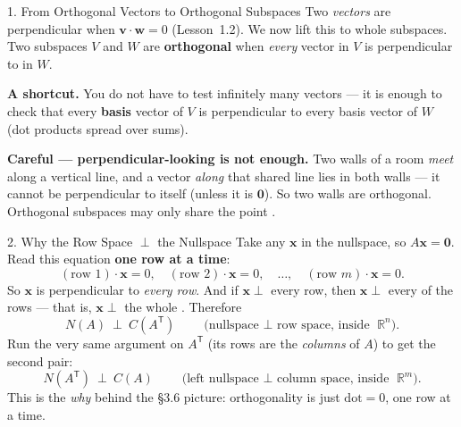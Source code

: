 \documentclass[10pt]{article}
\newcommand{\vv}{\mathbf{v}}
\newcommand{\ww}{\mathbf{w}}
\newcommand{\xx}{\mathbf{x}}
\newcommand{\zero}{\mathbf{0}}
\newcommand{\T}{\mathsf{T}}
\begin{document}
\begin{notesbox}{1. From Orthogonal Vectors to Orthogonal Subspaces}
Two \emph{vectors} are perpendicular when $\vv\cdot\ww=0$ (Lesson~1.2). We now lift this to whole
subspaces. Two subspaces $V$ and $W$ are \textbf{orthogonal} when \emph{every} vector in $V$ is
perpendicular to  in $W$.

\vspace{3pt}
\textbf{A shortcut.} You do not have to test infinitely many vectors --- it is enough to check that
every \textbf{basis} vector of $V$ is perpendicular to every basis vector of $W$ (dot products spread
over sums).

\vspace{3pt}
\textbf{Careful --- perpendicular-looking is not enough.} Two walls of a room \emph{meet} along a
vertical line, and a vector \emph{along} that shared line lies in both walls --- it cannot be
perpendicular to itself (unless it is $\zero$). So two walls are  orthogonal. Orthogonal
subspaces may only share the point \ans{$\zero$}.
\end{notesbox}

\begin{notesbox}{2. Why the Row Space $\perp$ the Nullspace}
Take any $\xx$ in the nullspace, so $A\xx=\zero$. Read this equation \textbf{one row at a time}:
\[
  (\text{row }1)\cdot\xx=0,\quad (\text{row }2)\cdot\xx=0,\quad \dots,\quad (\text{row }m)\cdot\xx=0.
\]
So $\xx$ is perpendicular to \emph{every row}. And if $\xx\perp$ every row, then $\xx\perp$ every
 of the rows --- that is, $\xx\perp$ the whole . Therefore
\[
  N(A)\ \perp\ C(A^{\T}) \qquad\text{(nullspace $\perp$ row space, inside }\mathbb{R}^n).
\]
Run the very same argument on $A^{\T}$ (its rows are the \emph{columns} of $A$) to get the second pair:
\[
  N(A^{\T})\ \perp\ C(A) \qquad\text{(left nullspace $\perp$ column space, inside }\mathbb{R}^m).
\]
This is the \emph{why} behind the §3.6 picture: orthogonality is just $\text{dot}=0$, one row at a time.
\end{notesbox}
\end{document}
